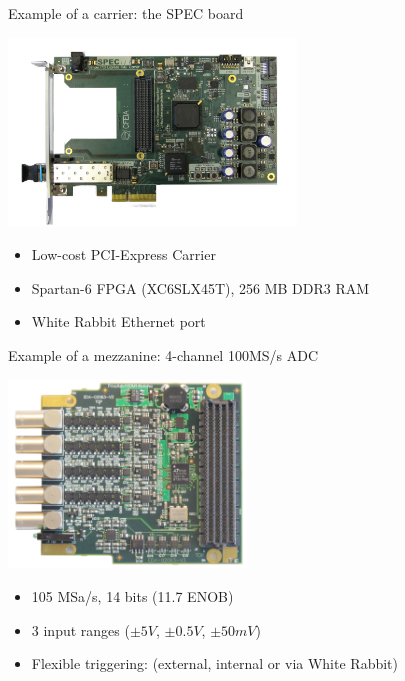 \documentclass[compress,red]{beamer}
\begin{document}
\begin{frame}{Example of a carrier: the SPEC board}
\begin{center}
\includegraphics[height=5cm]{node/spec_photo.jpg}
\begin{itemize}
\item Low-cost PCI-Express Carrier
\item Spartan-6 FPGA (XC6SLX45T), 256 MB DDR3 RAM
\item White Rabbit Ethernet port
\end{itemize}
\end{center}
\end{frame}

\begin{frame}{Example of a mezzanine: 4-channel 100MS/s ADC}
\begin{center}
\includegraphics[height=5cm]{node/adc.jpg}
\begin{itemize}
\item 105 MSa/s, 14 bits (11.7 ENOB)
\item 3 input ranges ($\pm5V$, $\pm0.5V$, $\pm50mV$)
\item Flexible triggering: (external, internal or via White Rabbit)
\end{itemize}
\end{center}
\end{frame}


\end{document}
